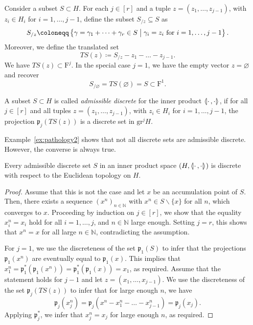 \documentclass[AHL,Unicode,longabstracts]{cedram}
\newcommand{\llangle}{\mathopen{\langle\mkern -3.1mu\lvert}}
\newcommand{\rrangle}{\mathclose{\rvert\mkern -3.1mu\rangle}}
\newcommand{\highinn}[2]{{\llangle#2\rrangle_{#1}}}
\newcommand{\st}{\bigm|}
\newcommand{\filter}{\mathrm{F}}
\newcommand{\N}{\mathbb{N}}
\newcommand{\grm}[2]{\mathrm{gr}_{#1}^{#2}}
\newcommand{\proj}{\mathfrak{p}}
\renewcommand{\setminus}{\smallsetminus}
\begin{document}
Consider a subset $S\subset H$. For each $j \in [r]$ and a tuple $z = (z_1, \dots, z_{j-1})$, with $z_i \in H_i$ for $i=1,\dots, j-1$, define the subset $S_{/z} \subseteq S$ as
\begin{equation}\label{eq:SOver}
S_{/z} \coloneqq \left\{ \gamma=\gamma_1 + \dots + \gamma_r \in S \st \gamma_i = z_i \text{ for $i=1, \dots, j-1$} \right\}.
\end{equation}
Moreover, we define the translated set
\begin{equation}\label{eq:Translation}
TS(z) \coloneqq S_{/z} - z_1 - \dots -z_{j-1}.
\end{equation}
We have $TS(z) \subset \filter^j$. In the special case $j=1$, we have the empty vector $z = \varnothing$ and recover
\[
S_{/\varnothing} = TS (\varnothing) = S \subset \filter^1.
\]
\begin{defi}
A subset $S \subset H$ is called \emph{admissible discrete} for the inner product $\highinn{}{\cdot\,,\cdot}$, if for all $j \in [r]$ and all tuples $z= (z_1, \dots, z_{j-1})$, with $z_i \in H_i$ for $i=1,\dots, j-1$, the projection $\proj_j(TS(z))$ is a discrete set in $\grm{}{j} H$.%
\end{defi}

Example~\ref{ex:pathology2} shows that not all discrete sets are admissible discrete. However, the converse is always true.

\begin{prop}\label{prop:discrete-discrete}
Every admissible discrete set $S$ in an inner product space $(H, \highinn{}{\cdot \,, \cdot})$ is discrete with respect to the Euclidean topology on $H$.
\end{prop}

\begin{proof}
Assume that this is not the case and let $x$ be an accumulation point of $S$. Then, there exists a sequence $(x^n)_{n \in \N}$ with $ x^n\in S \setminus \{x\}$ for all $n$, which converges to $x$. Proceeding by induction on $j\in [r]$, we show that the equality $x^n_i =x_i$ hold for all $i=1, \dots, j$, and $n \in \N$ large enough. Setting $j=r$, this shows that $x^n = x$ for all large $n \in \N$, contradicting the assumption.

For $j=1$, we use the discreteness of the set $\proj_1(S)$ to infer that the projections $\proj_1(x^n)$ are eventually equal to $\proj_1(x)$. This implies that $x^n_1 = \proj_1^*(\proj_1(x^n)) = \proj_1^*(\proj_1(x)) =x_1$, as required. Assume that the statement holds for $j-1$ and let $z = (x_1, \dots, x_{j-1})$. We use the discreteness of the set $\proj_j(TS(z))$ to infer that for large enough $n$, we have
\[
\proj_j\left(x^n_j\right) = \proj_j\left(x^n - x^n_1-\dots -x^n_{j-1}\right) = \proj_j(x_j).
\]
Applying $\proj_j^*$, we infer that $x^n_j = x_j$ for large enough $n$, as required.
\end{proof}
\end{document}
